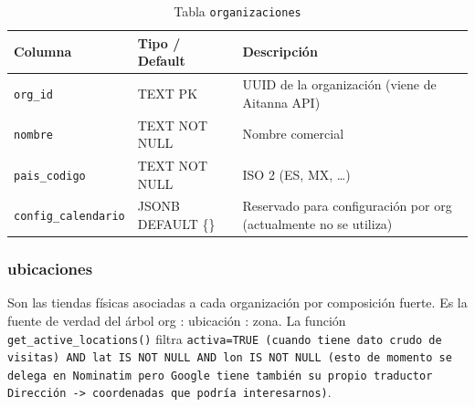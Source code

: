 \documentclass[12pt, a4paper]{article}
\begin{document}
\begin{table}[H]
\centering
\renewcommand{\arraystretch}{1.2}
\begin{tabular}{llp{5.5cm}}
\toprule
\textbf{Columna} & \textbf{Tipo / Default} & \textbf{Descripción} \\
\midrule
\texttt{org\_id}            & TEXT PK          & UUID de la organización (viene de Aitanna API) \\
\texttt{nombre}             & TEXT NOT NULL    & Nombre comercial \\
\texttt{pais\_codigo}       & TEXT NOT NULL    & ISO 2 (ES, MX, \ldots) \\
\texttt{config\_calendario} & JSONB DEFAULT \{\} & Reservado para configuración por org (actualmente no se utiliza) \\
\bottomrule
\end{tabular}
\caption{Tabla \texttt{organizaciones}}
\end{table}

\subsubsection{ubicaciones}

Son las tiendas físicas asociadas a cada organización por composición fuerte. Es la fuente de verdad del árbol org : ubicación : zona. La función \texttt{get\_active\_locations()} filtra \texttt{activa=TRUE (cuando tiene dato crudo de visitas) AND lat IS NOT NULL AND lon IS NOT NULL (esto de momento se delega en Nominatim pero Google tiene también su propio traductor Dirección -> coordenadas que podría interesarnos)}.
\end{document}

